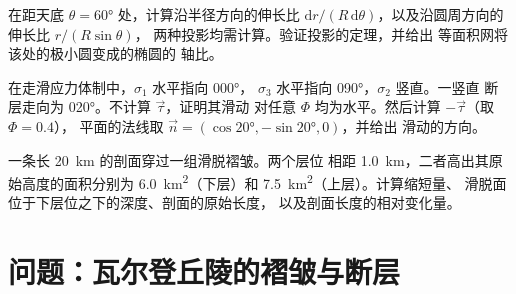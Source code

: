 \begin{exercise}[$\star\star\star$]\label{exo:b3:structural-analysis:10}
在距天底 $\theta = \ang{60}$ 处，计算沿半径方向的伸长比
$\mathrm dr/(R\,\mathrm d\theta)$，以及沿圆周方向的伸长比 $r/(R\sin\theta)$，
两种投影均需计算。验证投影的定理，并给出
等面积网将该处的极小圆变成的椭圆的
轴比。
\end{exercise}

\begin{exercise}[$\star\star\star$]\label{exo:b3:structural-analysis:11}
在走滑应力体制中，$\sigma_1$ 水平指向 \ang{000}，
$\sigma_3$ 水平指向 \ang{090}，$\sigma_2$ 竖直。一竖直
断层走向为 \ang{020}。不计算 $\vec\tau$，证明其滑动
对任意 $\Phi$ 均为水平。然后计算 $-\vec\tau$（取 $\Phi = 0.4$），
平面的法线取 $\vec n = (\cos\ang{20}, -\sin\ang{20}, 0)$，并给出
滑动的方向。
\end{exercise}

\begin{exercise}[$\star\star\star$]\label{exo:b3:structural-analysis:12}
一条长 \qty{20}{km} 的剖面穿过一组滑脱褶皱。两个层位
相距 \qty{1.0}{km}，二者高出其原始高度的面积分别为
\qty{6.0}{km^2}（下层）和 \qty{7.5}{km^2}（上层）。计算缩短量、
滑脱面位于下层位之下的深度、剖面的原始长度，
以及剖面长度的相对变化量。
\end{exercise}

\section{问题：瓦尔登丘陵的褶皱与断层}

